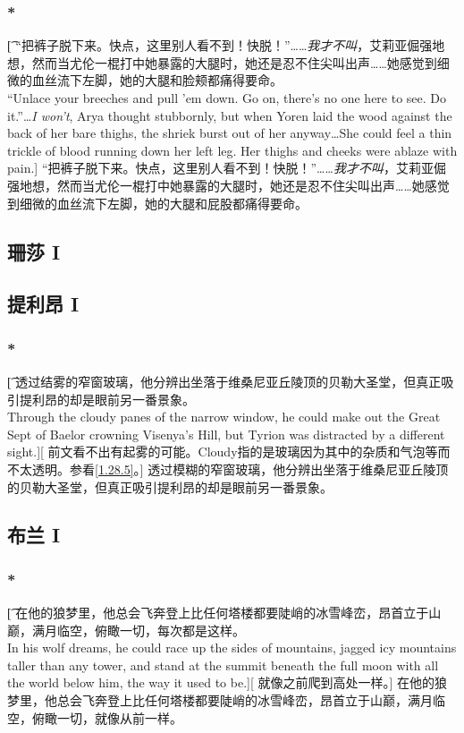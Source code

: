 \documentclass[12pt,a4paper]{article}
\begin{document}
\subsubsection{\color{red}*}\t[
“把裤子脱下来。快点，这里别人看不到！快脱！”……\emph{我才不叫}，艾莉亚倔强地想，然而当尤伦一棍打中她暴露的大腿时，她还是忍不住尖叫出声……她感觉到细微的血丝流下左脚，她的大腿和脸颊都痛得要命。\\
“Unlace your breeches and pull 'em down. Go on, there's no one here to see. Do it.”\ldots \emph{I won't}, Arya thought stubbornly, but when Yoren laid the wood against the back of her bare thighs, the shriek burst out of her anyway\ldots She could feel a thin trickle of blood running down her left leg. Her thighs and cheeks were ablaze with pain.]
“把裤子脱下来。快点，这里别人看不到！快脱！”……\emph{我才不叫}，艾莉亚倔强地想，然而当尤伦一棍打中她暴露的大腿时，她还是忍不住尖叫出声……她感觉到细微的血丝流下左脚，她的大腿和屁股都痛得要命。

\subsection{珊莎 I}

\subsection{提利昂 I}
\subsubsection{\color{red}*}\t[
	透过结雾的窄窗玻璃，他分辨出坐落于维桑尼亚丘陵顶的贝勒大圣堂，但真正吸引提利昂的却是眼前另一番景象。\\
	Through the cloudy panes of the narrow window, he could make out the Great Sept of Baelor crowning Visenya's Hill, but Tyrion was distracted by a different sight.][
	前文看不出有起雾的可能。Cloudy指的是玻璃因为其中的杂质和气泡等而不太透明。参看\ref{1.28.5}。]
	透过模糊的窄窗玻璃，他分辨出坐落于维桑尼亚丘陵顶的贝勒大圣堂，但真正吸引提利昂的却是眼前另一番景象。
	
\subsection{布兰 I}
\subsubsection{\color{red}*}\t[
	在他的狼梦里，他总会飞奔登上比任何塔楼都要陡峭的冰雪峰峦，昂首立于山巅，满月临空，俯瞰一切，每次都是这样。\\
	In his wolf dreams, he could race up the sides of mountains, jagged icy mountains taller than any tower, and stand at the summit beneath the full moon with all the world below him, the way it used to be.][
	就像之前爬到高处一样。]
	在他的狼梦里，他总会飞奔登上比任何塔楼都要陡峭的冰雪峰峦，昂首立于山巅，满月临空，俯瞰一切，就像从前一样。
\end{document}
